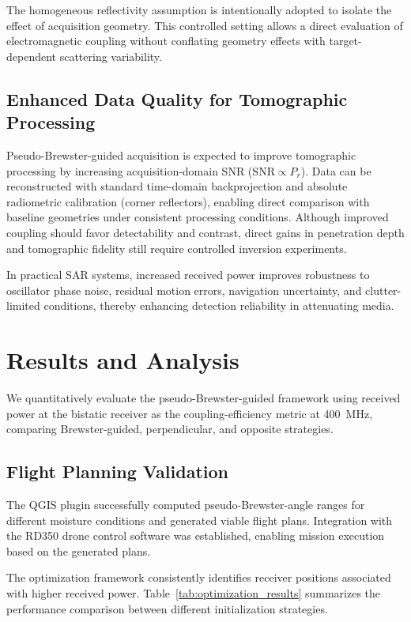 \documentclass[conference]{IEEEtran}
\begin{document}
The homogeneous reflectivity assumption is intentionally adopted to isolate the effect of acquisition geometry. This controlled setting allows a direct evaluation of electromagnetic coupling without conflating geometry effects with target-dependent scattering variability.

\subsection{Enhanced Data Quality for Tomographic Processing}

Pseudo-Brewster-guided acquisition is expected to improve tomographic processing by increasing acquisition-domain SNR ($\mathrm{SNR} \propto P_r$). Data can be reconstructed with standard time-domain backprojection and absolute radiometric calibration (corner reflectors), enabling direct comparison with baseline geometries under consistent processing conditions. Although improved coupling should favor detectability and contrast, direct gains in penetration depth and tomographic fidelity still require controlled inversion experiments.

In practical SAR systems, increased received power improves robustness to oscillator phase noise, residual motion errors, navigation uncertainty, and clutter-limited conditions, thereby enhancing detection reliability in attenuating media.

\section{Results and Analysis}

We quantitatively evaluate the pseudo-Brewster-guided framework using received power at the bistatic receiver as the coupling-efficiency metric at 400~MHz, comparing Brewster-guided, perpendicular, and opposite strategies.

\subsection{Flight Planning Validation}

The QGIS plugin successfully computed pseudo-Brewster-angle ranges for different moisture conditions and generated viable flight plans. Integration with the RD350 drone control software was established, enabling mission execution based on the generated plans.

The optimization framework consistently identifies receiver positions associated with higher received power. Table~\ref{tab:optimization_results} summarizes the performance comparison between different initialization strategies.
\end{document}
